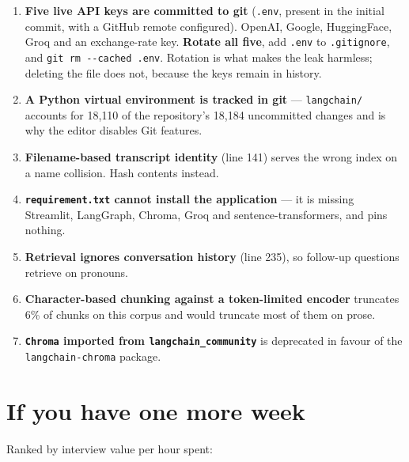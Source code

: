 \documentclass[11pt,a4paper]{article}
\begin{document}
\begin{enumerate}[leftmargin=*]
  \item \textbf{Five live API keys are committed to git} (\texttt{.env}, present
        in the initial commit, with a GitHub remote configured). OpenAI, Google,
        HuggingFace, Groq and an exchange-rate key. \textbf{Rotate all five},
        add \texttt{.env} to \texttt{.gitignore}, and
        \texttt{git rm -{}-cached .env}. Rotation is what makes the leak harmless;
        deleting the file does not, because the keys remain in history.
  \item \textbf{A Python virtual environment is tracked in git} ---
        \texttt{langchain/} accounts for 18{,}110 of the repository's 18{,}184
        uncommitted changes and is why the editor disables Git features.
  \item \textbf{Filename-based transcript identity} (line 141) serves the wrong
        index on a name collision. Hash contents instead.
  \item \textbf{\texttt{requirement.txt} cannot install the application} --- it is
        missing Streamlit, LangGraph, Chroma, Groq and sentence-transformers, and
        pins nothing.
  \item \textbf{Retrieval ignores conversation history} (line 235), so follow-up
        questions retrieve on pronouns.
  \item \textbf{Character-based chunking against a token-limited encoder}
        truncates 6\% of chunks on this corpus and would truncate most of them on
        prose.
  \item \textbf{\texttt{Chroma} imported from \texttt{langchain\_community}} is
        deprecated in favour of the \texttt{langchain-chroma} package.
\end{enumerate}

\section{If you have one more week}\label{sec:nextsteps}

Ranked by interview value per hour spent:
\end{document}
